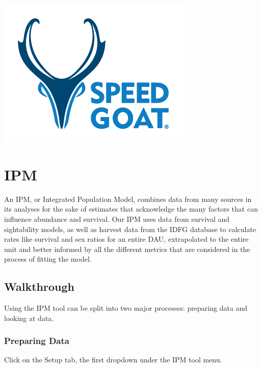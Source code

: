 \documentclass[
]{book}
\begin{document}
\href{https://www.speedgoat.io}{\includegraphics{./www/spdgt_logo.png}}

\hypertarget{ipm}{%
\chapter{IPM}\label{ipm}}

An IPM, or Integrated Population Model, combines data from many sources in its analyses for the sake of estimates that acknowledge the many factors that can influence abundance and survival. Our IPM uses data from survival and sightability models, as well as harvest data from the IDFG database to calculate rates like survival and sex ratios for an entire {DAU}, extrapolated to the entire unit and better informed by all the different metrics that are considered in the process of fitting the model.

\hypertarget{ipm-model}{%
\section{Walkthrough}\label{ipm-model}}

Using the IPM tool can be split into two major processes: preparing data and looking at data.

\hypertarget{ipm-load}{%
\subsection{Preparing Data}\label{ipm-load}}

Click on the Setup tab, the first dropdown under the IPM tool menu.
\end{document}
